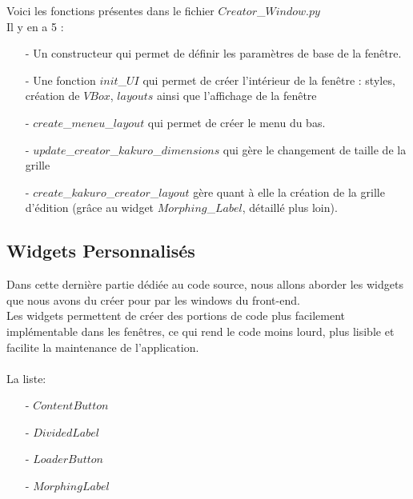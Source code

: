 \documentclass[french,12pt]{article}
\begin{document}
Voici les fonctions présentes dans le fichier $Creator$\_$Window.py$ \\
Il y en a 5 : \\

\begin{enumerate}
	\item[-] Un constructeur qui permet de définir les paramètres de base de la fenêtre.
	\item[-] Une fonction $init$\_$UI$ qui permet de créer l'intérieur de la fenêtre : 			styles, création de $VBox$, $layouts$ ainsi que l'affichage de la fenêtre
	\item[-] $create$\_$meneu$\_$layout$ qui permet de créer le menu du bas.
	\item[-] $update$\_$creator$\_$kakuro$\_$dimensions$ qui gère le changement de taille 		de la grille
	\item[-] $create$\_$kakuro$\_$creator$\_$layout$ gère quant à elle la création de la grille d'édition (grâce au widget $Morphing$\_$Label$, détaillé plus loin).
\end{enumerate}
\newpage 



\subsection{Widgets Personnalisés}
Dans cette dernière partie dédiée au code source, nous allons aborder les widgets que nous avons du créer pour par les windows du front-end. \\
Les widgets permettent de créer des portions de code plus facilement implémentable dans les fenêtres, ce qui rend le code moins lourd, plus lisible et facilite la maintenance de l'application. \\ \\
 La liste: \\

\begin{enumerate}
	\item[-] $ContentButton$
	\item[-] $DividedLabel$
	\item[-] $LoaderButton$
	\item[-] $MorphingLabel$ \\
\end{enumerate}
\end{document}
